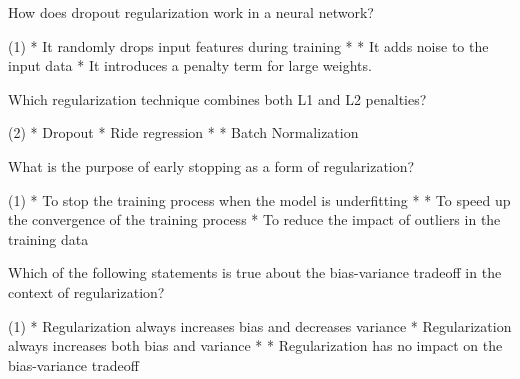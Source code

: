 \documentclass[10pt]{extarticle}
\begin{document}
\begin{exercise}
    How does dropout regularization work in a neural network?
    \begin{choice}(1)
        * It randomly drops input features during training
        * 
        * It adds noise to the input data
        * It introduces a penalty term for large weights.
    \end{choice}
\end{exercise}
\begin{solution}
\end{solution}

\begin{exercise}
    Which regularization technique combines both L1 and L2 penalties?
    \begin{choice} (2)
        * Dropout
        * Ride regression
        * 
        * Batch Normalization
    \end{choice}
\end{exercise}
\begin{solution}
\end{solution}

\begin{exercise}
    What is the purpose of early stopping as a form of regularization?
    \begin{choice} (1)
        * To stop the training process when the model is underfitting
        * 
        * To speed up the convergence of the training process
        * To reduce the impact of outliers in the training data
    \end{choice}
\end{exercise}
\begin{solution}
\end{solution}

\begin{exercise}
    Which of the following statements is true about the bias-variance tradeoff in the context of regularization?
    \begin{choice} (1)
        * Regularization always increases bias and decreases variance
        * Regularization always increases both bias and variance
        * 
        * Regularization has no impact on the bias-variance tradeoff
    \end{choice}
\end{exercise}
\begin{solution}
\end{solution}
\end{document}
